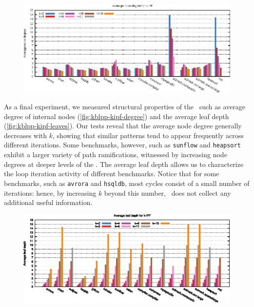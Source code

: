 \ifdefined\noauthorea
\begin{figure}[!ht]
\begin{center}
\includegraphics[width=\textwidth]{figures/kblpp-kipf-degree/kblpp-kipf-degree.eps}
\caption{\protect}
\end{center}
\end{figure}
\fi

As a final experiment, we measured structural properties of the \kipf\ such as average degree of internal nodes (\myfigure\ref{fig:kblpp-kipf-degree}) and the average leaf depth (\myfigure\ref{fig:kblpp-kipf-leaves}). Our tests reveal that the average node degree generally decreases with $k$, showing that similar patterns tend to appear frequently across different iterations. Some benchmarks, however, such as {\tt sunflow} and {\tt heapsort} exhibit a larger variety of path ramifications, witnessed by increasing node degrees at deeper levels of the \kipf. The average leaf depth allows us to characterize the loop iteration activity of different benchmarks. Notice that for some benchmarks, such as {\tt avrora} and {\tt hsqldb}, most cycles consist of a small number of iterations: hence, by increasing $k$ beyond this number, \kblpp\ does not collect any additional useful information.

\ifdefined\noauthorea
\begin{figure}[!ht]
\begin{center}
\includegraphics[width=\textwidth]{figures/kblpp-kipf-leaves/kblpp-kipf-leaves.eps}
\caption{\protect}
\end{center}
\end{figure}
\fi